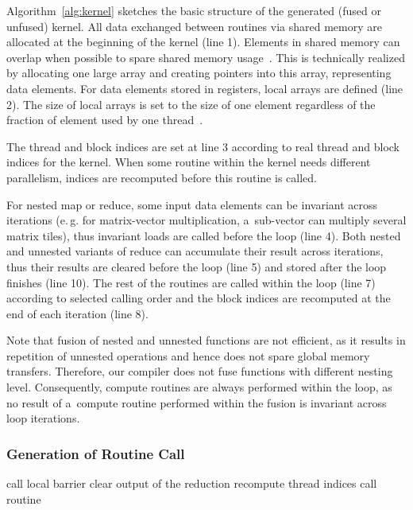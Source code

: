\documentclass[final]{siamltex}
\def\eg{e.\,g.}
\begin{document}
{Algorithm~\ref{alg:kernel} sketches the basic structure of the generated (fused or unfused) kernel. All data exchanged between routines via shared memory are allocated at the beginning of the kernel (line 1). Elements in shared memory can overlap when possible to spare shared memory usage~\cite{fousek2011automatic}. This is technically realized by allocating one large array and creating pointers into this array, representing data elements. For data elements stored in registers, local arrays are defined (line 2). The size of local arrays is set to the size of one element regardless of the fraction of element used by one thread~\cite{filipovic2012automatically}.

The thread and block indices are set at line 3 according to real thread and block indices for the kernel. When some routine within the kernel needs different parallelism, indices are recomputed before this routine is called.

For nested map or reduce, some input data elements can be invariant across iterations (\eg{} for matrix-vector multiplication, a~sub-vector can multiply several matrix tiles), thus invariant loads are called before the loop (line 4). Both nested and unnested variants of reduce can accumulate their result across iterations, thus their results are cleared before the loop (line 5) and stored after the loop finishes (line 10). The rest of the routines are called within the loop (line 7) according to selected calling order and the block indices are recomputed at the end of each iteration (line 8).

Note that fusion of nested and unnested functions are not efficient, as it results in repetition of unnested operations and hence does not spare global memory transfers. Therefore, our compiler does not fuse functions with different nesting level. Consequently, compute routines are always performed within the loop, as no result of a~compute routine performed within the fusion is invariant across loop iterations.

\subsubsection{Generation of Routine Call}

\begin{algorithm}[subsection]
\caption{Schema of routine call}
\label{alg:routine}
{
\begin{algorithmic}[1]
{
\STATE call local barrier
\STATE clear output of the reduction
\STATE recompute thread indices
\STATE call routine
\ENDIF
}
\end{algorithmic}
}
\end{algorithm}

}
\end{document}
